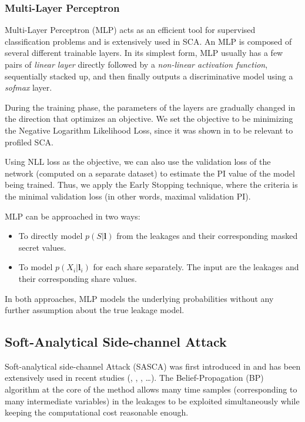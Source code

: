 \documentclass{llncs}
\begin{document}
	\subsubsection*{Multi-Layer Perceptron} 
	Multi-Layer Perceptron (MLP) acts as an efficient tool for supervised classification problems  and is extensively used in SCA. An MLP is composed of several different  trainable layers. In its simplest form, MLP usually has a few pairs of \textit{linear layer} directly followed by a \textit{non-linear activation function}, sequentially stacked up, and then finally outputs a discriminative model using a \textit{sofmax} layer. 
	
	During the training phase, the parameters of the layers are gradually changed in the direction that optimizes an objective. We set the objective to be minimizing the Negative Logarithm Likelihood Loss, since it was shown in \cite{DNN} to be relevant to profiled SCA.
	
	Using NLL loss as the objective, we can also use the validation loss of the network (computed on a separate dataset) to estimate the PI value of the model being trained. Thus, we apply the Early Stopping technique, where the criteria is the minimal validation loss (in other words, maximal validation PI). 
	
	MLP can be approached in two ways:
	\begin{itemize}
		\item To directly model $p(S|\bm{l})$ from the leakages and their corresponding masked secret values.
		\item To model  $p(X_i|\bm{l}_i)$  for each share separately. The input are the leakages and their corresponding share values.
	\end{itemize}

	In both approaches, MLP models the underlying probabilities without any further assumption about the true leakage model. 
	\subsection*{Soft-Analytical Side-channel Attack}
	Soft-analytical side-channel Attack (SASCA) was first introduced in \cite{sasca} and has been extensively used in recent studies (\cite{lcert}, \cite{mshares}, \cite{primemask}, \dots). The Belief-Propagation (BP) algorithm at the core of the method allows many time samples (corresponding to many intermediate variables) in the leakages to be exploited simultaneously while keeping the computational cost reasonable enough. 
	
\end{document}
